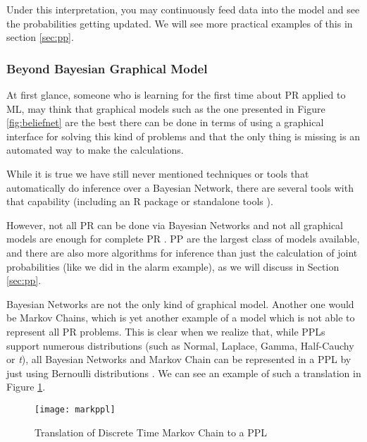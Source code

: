 \begin{itemsize}
Under this interpretation, you may continuously feed data into the model and see
the probabilities getting updated. We will see more practical examples of this
in section \ref{sec:pp}.

\subsubsection{Beyond Bayesian Graphical Model}

At first glance, someone who is learning for the first time about PR applied
to ML, may think that graphical models such as the one presented in Figure
\ref{fig:beliefnet} are the best there can be done in terms of using a graphical
interface for solving this kind of problems and that the only thing is missing
is an automated way to make the calculations.

While it is true we have still never mentioned techniques or tools that
automatically do inference over a Bayesian Network, there are several tools
with that capability (including an R package \cite{Højsgaard2013} or
standalone tools \cite{msbn}).

However, not all PR can be done via Bayesian Networks and not all graphical models
are enough for complete PR \cite{intpp}. PP are the largest class of models available, and there are
also more algorithms for inference than just the calculation of joint
probabilities (like we did in the alarm example), as we will discuss in Section
\ref{sec:pp}.

Bayesian Networks are not the only kind of graphical model. Another one would be
Markov Chains, which is yet another example of a model which is not able to
represent all PR problems. This is clear when we realize that, while PPLs
support numerous distributions (such as Normal, Laplace,
Gamma, Half-Cauchy or \textit{t}), all Bayesian Networks and Markov Chain
can be represented in a PPL by just using Bernoulli distributions \cite{PPm}.
We can see an example of such a translation in Figure \ref{fig:mppl}.

\begin{figure}[t]
  \begin{center}
    \leavevmode
    \texttt{[image: markppl]}
    \caption{Translation of Discrete Time Markov Chain to a PPL \cite{PPm}}
    \label{fig:mppl}
  \end{center}
\end{figure}



\end{itemsize}
